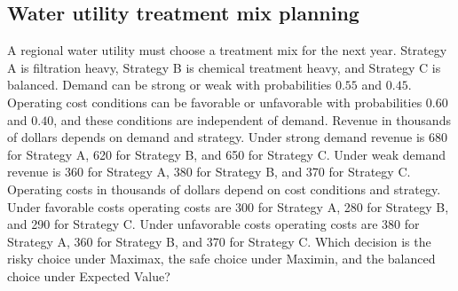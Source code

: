 \begin{ExamProblems}
		\item
		\subsection*{Water utility treatment mix planning}
		A regional water utility must choose a treatment mix for the next year. Strategy A is filtration heavy, Strategy B is chemical treatment heavy, and Strategy C is balanced. Demand can be strong or weak with probabilities $0.55$ and $0.45$. Operating cost conditions can be favorable or unfavorable with probabilities $0.60$ and $0.40$, and these conditions are independent of demand. Revenue in thousands of dollars depends on demand and strategy. Under strong demand revenue is 680 for Strategy A, 620 for Strategy B, and 650 for Strategy C. Under weak demand revenue is 360 for Strategy A, 380 for Strategy B, and 370 for Strategy C. Operating costs in thousands of dollars depend on cost conditions and strategy. Under favorable costs operating costs are 300 for Strategy A, 280 for Strategy B, and 290 for Strategy C. Under unfavorable costs operating costs are 380 for Strategy A, 360 for Strategy B, and 370 for Strategy C. Which decision is the risky choice under Maximax, the safe choice under Maximin, and the balanced choice under Expected Value?
	\end{ExamProblems}

